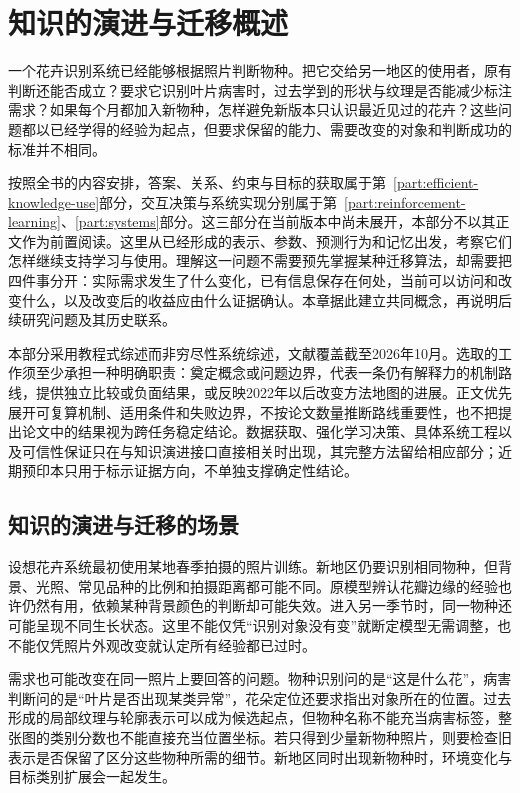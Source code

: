 \chapter{知识的演进与迁移概述}
\label{chap:ket-overview}

一个花卉识别系统已经能够根据照片判断物种。把它交给另一地区的使用者，原有判断还能否成立？要求它识别叶片病害时，过去学到的形状与纹理是否能减少标注需求？如果每个月都加入新物种，怎样避免新版本只认识最近见过的花卉？这些问题都以已经学得的经验为起点，但要求保留的能力、需要改变的对象和判断成功的标准并不相同。

按照全书的内容安排，答案、关系、约束与目标的获取属于第~\ref{part:efficient-knowledge-use}部分，交互决策与系统实现分别属于第~\ref{part:reinforcement-learning}、\ref{part:systems}部分。这三部分在当前版本中尚未展开，本部分不以其正文作为前置阅读。这里从已经形成的表示、参数、预测行为和记忆出发，考察它们怎样继续支持学习与使用。理解这一问题不需要预先掌握某种迁移算法，却需要把四件事分开：实际需求发生了什么变化，已有信息保存在何处，当前可以访问和改变什么，以及改变后的收益应由什么证据确认。本章据此建立共同概念，再说明后续研究问题及其历史联系。

本部分采用教程式综述而非穷尽性系统综述，文献覆盖截至2026年10月。选取的工作须至少承担一种明确职责：奠定概念或问题边界，代表一条仍有解释力的机制路线，提供独立比较或负面结果，或反映2022年以后改变方法地图的进展。正文优先展开可复算机制、适用条件和失败边界，不按论文数量推断路线重要性，也不把提出论文中的结果视为跨任务稳定结论。数据获取、强化学习决策、具体系统工程以及可信性保证只在与知识演进接口直接相关时出现，其完整方法留给相应部分；近期预印本只用于标示证据方向，不单独支撑确定性结论。

\section{知识的演进与迁移的场景}
\label{sec:ket-overview-scenarios}

设想花卉系统最初使用某地春季拍摄的照片训练。新地区仍要识别相同物种，但背景、光照、常见品种的比例和拍摄距离都可能不同。原模型辨认花瓣边缘的经验也许仍然有用，依赖某种背景颜色的判断却可能失效。进入另一季节时，同一物种还可能呈现不同生长状态。这里不能仅凭“识别对象没有变”就断定模型无需调整，也不能仅凭照片外观改变就认定所有经验都已过时。

需求也可能改变在同一照片上要回答的问题。物种识别问的是“这是什么花”，病害判断问的是“叶片是否出现某类异常”，花朵定位还要求指出对象所在的位置。过去形成的局部纹理与轮廓表示可以成为候选起点，但物种名称不能充当病害标签，整张图的类别分数也不能直接充当位置坐标。若只得到少量新物种照片，则要检查旧表示是否保留了区分这些物种所需的细节。新地区同时出现新物种时，环境变化与目标类别扩展会一起发生。

